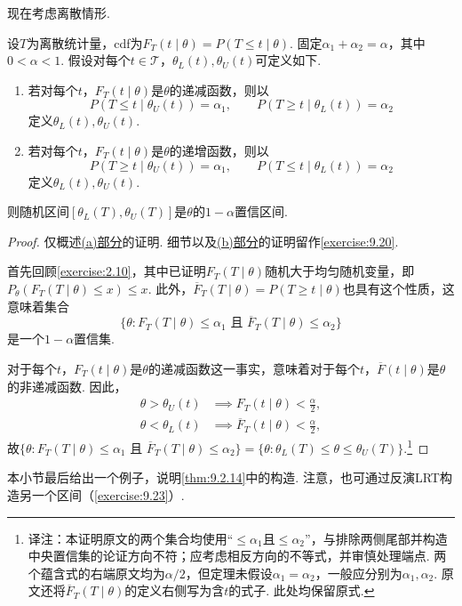 现在考虑离散情形.
\begin{theorem}[对离散cdf作枢轴变换]\label{thm:9.2.14}
设$T$为离散统计量，cdf为$F_T(t\mid\theta)=P(T\le t\mid\theta)$. 固定$\alpha_1+\alpha_2=\alpha$，其中$0<\alpha<1$. 假设对每个$t\in\mathcal T$，$\theta_L(t),\theta_U(t)$可定义如下.
\begin{enumerate}[label=\roman*.]
\item\label{item:9.2.14.i}若对每个$t$，$F_T(t\mid\theta)$是$\theta$的递减函数，则以
$$P(T\le t\mid\theta_U(t))=\alpha_1,\qquad P(T\ge t\mid\theta_L(t))=\alpha_2$$
定义$\theta_L(t),\theta_U(t)$.
\item\label{item:9.2.14.ii}若对每个$t$，$F_T(t\mid\theta)$是$\theta$的递增函数，则以
$$P(T\ge t\mid\theta_U(t))=\alpha_1,\qquad P(T\le t\mid\theta_L(t))=\alpha_2$$
定义$\theta_L(t),\theta_U(t)$.
\end{enumerate}
则随机区间$[\theta_L(T),\theta_U(T)]$是$\theta$的$1-\alpha$置信区间.
\end{theorem}
\begin{proof}
仅概述\hyperref[item:9.2.14.i]{(a)部分}的证明. 细节以及\hyperref[item:9.2.14.ii]{(b)部分}的证明留作\autoref{exercise:9.20}.

首先回顾\autoref{exercise:2.10}，其中已证明$F_T(T\mid\theta)$随机大于均匀随机变量，即$P_\theta(F_T(T\mid\theta)\le x)\le x$. 此外，$\overline F_T(T\mid\theta)=P(T\ge t\mid\theta)$也具有这个性质，这意味着集合
$$\{\theta:F_T(T\mid\theta)\le\alpha_1\text{ 且 }\overline F_T(T\mid\theta)\le\alpha_2\}$$
是一个$1-\alpha$置信集.

对于每个$t$，$F_T(t\mid\theta)$是$\theta$的递减函数这一事实，意味着对于每个$t$，$\overline F(t\mid\theta)$是$\theta$的非递减函数. 因此，
$$\begin{aligned}
\theta>\theta_U(t)&\implies F_T(t\mid\theta)<\frac\alpha2,\\
\theta<\theta_L(t)&\implies\overline F_T(t\mid\theta)<\frac\alpha2,
\end{aligned}$$
故$\{\theta:F_T(T\mid\theta)\le\alpha_1\text{ 且 }\overline F_T(T\mid\theta)\le\alpha_2\}=\{\theta:\theta_L(T)\le\theta\le\theta_U(T)\}$.\footnote{译注：本证明原文的两个集合均使用“$\le\alpha_1$且$\le\alpha_2$”，与排除两侧尾部并构造中央置信集的论证方向不符；应考虑相反方向的不等式，并审慎处理端点. 两个蕴含式的右端原文均为$\alpha/2$，但定理未假设$\alpha_1=\alpha_2$，一般应分别为$\alpha_1,\alpha_2$. 原文还将$\overline F_T(T\mid\theta)$的定义右侧写为含$t$的式子. 此处均保留原式.}
\end{proof}
本小节最后给出一个例子，说明\autoref{thm:9.2.14}中的构造. 注意，也可通过反演LRT构造另一个区间（\autoref{exercise:9.23}）.
